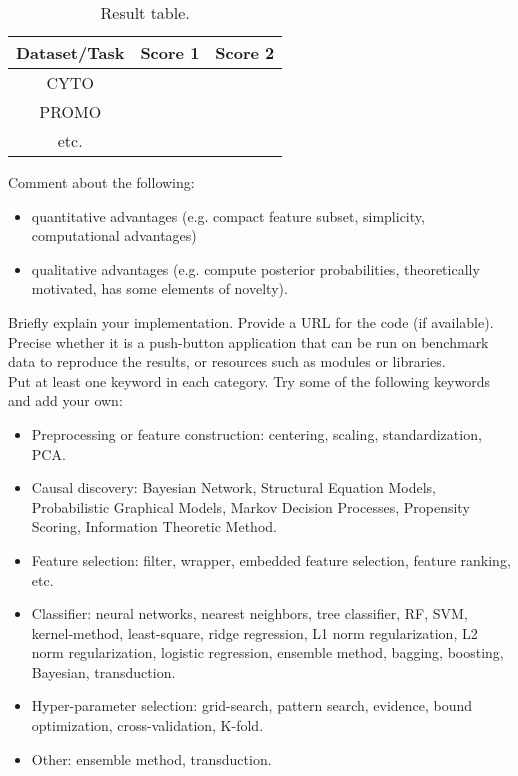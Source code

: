 \documentclass[twoside,11pt]{article}
\begin{document}
\begin{table}[h]
\begin{center}
\label{tab:table1}
\begin{tabular}{|c|c|c|}
\hline
Dataset/Task & Score 1 & Score 2 \\
\hline
CYTO &  & \\
PROMO & & \\
etc. & & \\
\hline

\end{tabular}
\caption{Result table.}
\end{center}
\end{table}

Comment about the following:
\begin{itemize}
\item quantitative advantages (e.g. compact feature subset, simplicity, computational advantages)
\item qualitative advantages (e.g. compute posterior probabilities, theoretically motivated, has some elements of novelty).
\end{itemize}
Briefly explain your implementation. Provide a URL for the code (if available). Precise whether it is a push-button application that can be run on benchmark data to reproduce the results, or resources such as modules or libraries. \\

Put at least one keyword in each category. Try some of the following keywords and add your own:
\begin{itemize}
\item Preprocessing or feature construction: centering, scaling, standardization, PCA.
\item Causal discovery: Bayesian Network, Structural Equation Models, Probabilistic Graphical Models, Markov Decision Processes, Propensity Scoring, Information Theoretic Method.
\item Feature selection: filter, wrapper, embedded feature selection, feature ranking, etc.
\item Classifier: neural networks, nearest neighbors, tree classifier, RF, SVM, kernel-method, least-square, ridge regression, L1 norm regularization, L2 norm regularization, logistic regression, ensemble method, bagging, boosting, Bayesian, transduction.
\item Hyper-parameter selection: grid-search, pattern search, evidence, bound optimization, cross-validation, K-fold.
\item Other: ensemble method, transduction.
\end{itemize}
\end{document}
